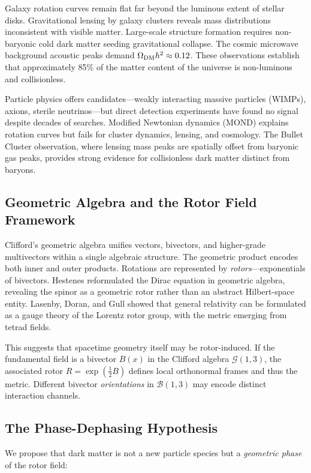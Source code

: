 \documentclass[11pt,a4paper]{article}
\numberwithin{equation}{section}
\theoremstyle{plain}
\theoremstyle{definition}
\theoremstyle{remark}
\newcommand{\Cl}{\mathcal{G}}               %
\newcommand{\bivec}{\mathcal{B}}            %
\begin{document}
Galaxy rotation curves remain flat far beyond the luminous extent of stellar disks. Gravitational lensing by galaxy clusters reveals mass distributions inconsistent with visible matter. Large-scale structure formation requires non-baryonic cold dark matter seeding gravitational collapse. The cosmic microwave background acoustic peaks demand $\Omega_{\rm DM} h^2 \approx 0.12$. These observations establish that approximately 85\% of the matter content of the universe is non-luminous and collisionless.

Particle physics offers candidates---weakly interacting massive particles (WIMPs), axions, sterile neutrinos---but direct detection experiments have found no signal despite decades of searches. Modified Newtonian dynamics (MOND) explains rotation curves but fails for cluster dynamics, lensing, and cosmology. The Bullet Cluster observation, where lensing mass peaks are spatially offset from baryonic gas peaks, provides strong evidence for collisionless dark matter distinct from baryons.

\subsection{Geometric Algebra and the Rotor Field Framework}

Clifford's geometric algebra unifies vectors, bivectors, and higher-grade multivectors within a single algebraic structure. The geometric product encodes both inner and outer products. Rotations are represented by \emph{rotors}---exponentials of bivectors. Hestenes reformulated the Dirac equation in geometric algebra, revealing the spinor as a geometric rotor rather than an abstract Hilbert-space entity. Lasenby, Doran, and Gull showed that general relativity can be formulated as a gauge theory of the Lorentz rotor group, with the metric emerging from tetrad fields.

This suggests that spacetime geometry itself may be rotor-induced. If the fundamental field is a bivector $B(x)$ in the Clifford algebra $\Cl(1,3)$, the associated rotor $R=\exp(\tfrac12 B)$ defines local orthonormal frames and thus the metric. Different bivector \emph{orientations} in $\bivec(1,3)$ may encode distinct interaction channels.

\subsection{The Phase-Dephasing Hypothesis}

We propose that dark matter is not a new particle species but a \emph{geometric phase} of the rotor field:
\end{document}
